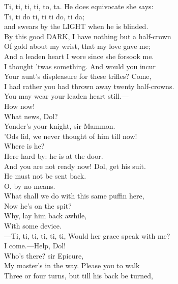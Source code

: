 \documentclass[a4paper,oneside]{memoir}
\begin{document}
\begin{drama*}
\subtlespeaks Ti, ti, ti, ti, to, ta. He does equivocate she says:\\
Ti, ti do ti, ti ti do, ti da;\\
and swears by the LIGHT when he is blinded.\\
\dapperspeaks By this good DARK, I have nothing but a half-crown\\
Of gold about my wrist, that my love gave me;\\
And a leaden heart I wore since she forsook me.\\
\facespeaks I thought 'twas something. And would you incur\\
Your aunt's displeasure for these trifles? Come,\\
I had rather you had thrown away twenty half-crowns.\\
You may wear your leaden heart still.---\\
How now!\\
\subtlespeaks {} What news, Dol?\\
\dolspeaks {} Yonder's your knight, sir Mammon.\\
\facespeaks 'Ods lid, we never thought of him till now!\\
Where is he?\\
\dolspeaks {} Here hard by: he is at the door.\\
\subtlespeaks And you are not ready now! Dol, get his suit.\\
He must not be sent back.\\
\facespeaks {} O, by no means.\\
What shall we do with this same puffin here,\\
Now he's on the spit?\\
\subtlespeaks {} Why, lay him back awhile,\\
With some device.\\
---Ti, ti, ti, ti, ti, ti, Would her grace speak with me?\\
I come.---Help, Dol!\\
\facespeaks {} Who's there? sir Epicure,\\
My master's in the way. Please you to walk\\
Three or four turns, but till his back be turned,\\

\end{drama*}
\end{document}
